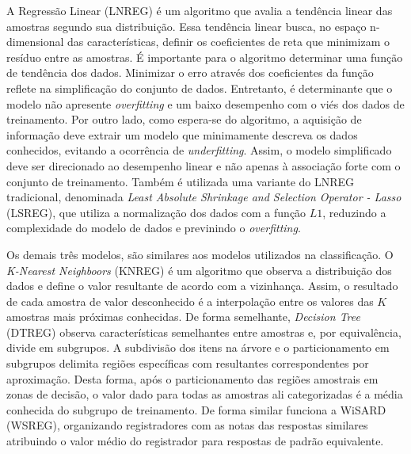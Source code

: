 \begin{minipage}[!h]{0.45\textwidth}
A Regressão Linear (LNREG) é um algoritmo que avalia a tendência linear das amostras segundo sua distribuição. Essa tendência linear busca, no espaço n-dimensional das características, definir os coeficientes de reta que minimizam o resíduo entre as amostras. É importante para o algoritmo determinar uma função de tendência dos dados. Minimizar o erro através dos coeficientes da função reflete na simplificação do conjunto de dados. Entretanto, é determinante que o modelo não apresente \textit{overfitting} e um baixo desempenho com o viés dos dados de treinamento. Por outro lado, como espera-se do algoritmo, a aquisição de informação deve extrair um modelo que minimamente descreva os dados conhecidos, evitando a ocorrência de \textit{underfitting}. Assim, o modelo simplificado deve ser direcionado ao desempenho linear e não apenas à associação forte com o conjunto de treinamento. Também é utilizada uma variante do LNREG tradicional, denominada \textit{Least Absolute Shrinkage and Selection Operator - Lasso} (LSREG), que utiliza a normalização dos dados com a função $ L1 $, reduzindo a complexidade do modelo de dados e previnindo o \textit{overfitting}.

Os demais três modelos, são similares aos modelos utilizados na classificação. O \textit{K-Nearest Neighboors} (KNREG) é um algoritmo que observa a distribuição dos dados e define o valor resultante de acordo com a vizinhança. Assim, o resultado de cada amostra de valor desconhecido é a interpolação entre os valores das $ K $ amostras mais próximas conhecidas. De forma semelhante, \textit{Decision Tree} (DTREG) observa características semelhantes entre amostras e, por equivalência, divide em subgrupos. A subdivisão dos itens na árvore e o particionamento em subgrupos delimita regiões específicas com resultantes correspondentes por aproximação. Desta forma, após o particionamento das regiões amostrais em zonas de decisão, o valor dado para todas as amostras ali categorizadas é a média conhecida do subgrupo de treinamento. De forma similar funciona a WiSARD (WSREG), organizando registradores com as notas das respostas similares atribuindo o valor médio do registrador para respostas de padrão equivalente.


\end{minipage}
